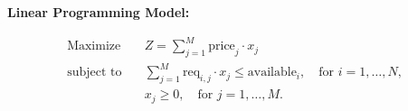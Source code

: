 \documentclass{article}
\begin{document}
\textbf{Linear Programming Model:}

\begin{align*}
\text{Maximize} \quad & Z = \sum_{j=1}^{M} \text{price}_j \cdot x_j \\
\text{subject to} \quad & \sum_{j=1}^{M} \text{req}_{i,j} \cdot x_j \leq \text{available}_i, \quad \text{for } i = 1, \ldots, N, \\
& x_j \geq 0, \quad \text{for } j = 1, \ldots, M.
\end{align*}
\end{document}
